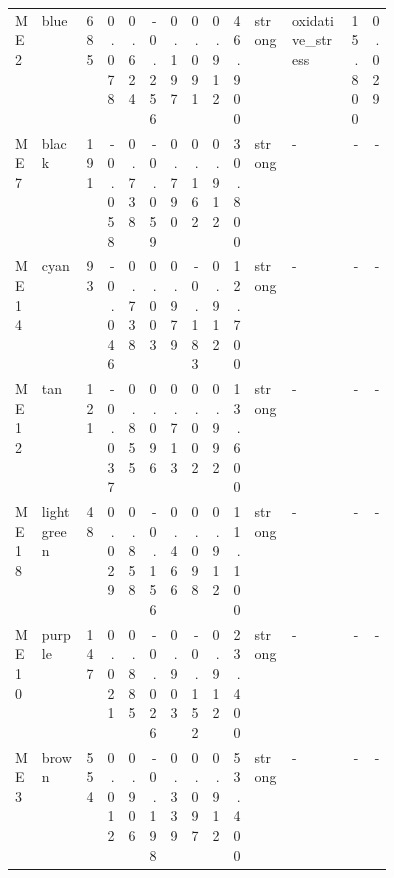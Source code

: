 \documentclass[11pt]{article}
\begin{document}
\begin{landscape}
\begin{longtable}{p{0.06\linewidth}p{0.12\linewidth}rrrrrrrrp{0.10\linewidth}p{0.16\linewidth}rr}
ME2 & blue & 685 & 0.078 & 0.624 & -0.256 & 0.197 & 0.091 & 0.912 & 46.900 & strong & oxidative\_stress & 15.800 & 0.029 \\
ME7 & black & 191 & -0.058 & 0.738 & -0.059 & 0.790 & 0.162 & 0.912 & 30.800 & strong & - & - & - \\
ME14 & cyan & 93 & -0.046 & 0.738 & 0.003 & 0.979 & -0.183 & 0.912 & 12.700 & strong & - & - & - \\
ME12 & tan & 121 & -0.037 & 0.855 & 0.096 & 0.713 & 0.002 & 0.992 & 13.600 & strong & - & - & - \\
ME18 & lightgreen & 48 & 0.029 & 0.858 & -0.156 & 0.466 & 0.098 & 0.912 & 11.100 & strong & - & - & - \\
ME10 & purple & 147 & 0.021 & 0.885 & -0.026 & 0.903 & -0.152 & 0.912 & 23.400 & strong & - & - & - \\
ME3 & brown & 554 & 0.012 & 0.906 & -0.198 & 0.339 & 0.097 & 0.912 & 53.400 & strong & - & - & - \\
\bottomrule
\end{longtable}
\normalsize
\end{landscape}
\end{document}
